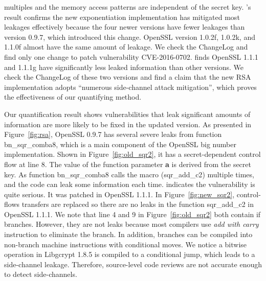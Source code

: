 multiples and the memory access patterns are independent of the secret key.
\tool{}'s result confirms the new exponentiation implementation has mitigated 
most leakages effectively because the four newer versions have fewer
leakages than version 0.9.7, which introduced this change.
OpenSSL version 1.0.2f, 1.0.2k, and 1.1.0f almost have the
same amount of leakage. We check the ChangeLog and find only one change to
patch vulnerability CVE-2016-0702. 
\tool{} finds OpenSSL 1.1.1 and 1.1.1g have significantly less
leaked information than other versions.
We check the ChangeLog of these two versions and find a claim that
the new RSA implementation adopts ``numerous side-channel attack mitigation'', 
which proves the effectiveness of our quantifying method.



Our quantification result shows vulnerabilities
that leak significant amounts of information
are more likely to be fixed in the updated version.
As presented in Figure~\ref{fig:rsa}, 
OpenSSL 0.9.7 has several severe leaks from
function \textsf{bn\_sqr\_comba8}, which is a main 
component of the OpenSSL big number implementation.
Shown in Figure~\ref{fig:old_sqr2}, it has a 
secret-dependent control flow at line 8.
The value of the function parameter \textbf{a} is derived from
the secret key. 
As function \textsf{bn\_sqr\_comba8}
calls the macro (\textsf{sqr\_add\_c2}) multiple times, 
and the code can leak some information each time.
\tool{} indicates the vulnerability is quite serious. 
It was patched in OpenSSL 1.1.1\@. In 
Figure~\ref{fig:new_sqr2}, control-flows transfers are replaced
so there are no leaks in the function
\textsf{sqr\_add\_c2} in OpenSSL 1.1.1\@. We note
that line 4 and 9 in Figure~\ref{fig:old_sqr2} both contain if branches.
However, they are not leaks because
most compilers use \emph{add with carry} instruction to eliminate the branch.
In addition, branches can be compiled into non-branch machine instructions 
with conditional moves. 
We notice a bitwise operation in Libgcrypt 1.8.5 is compiled to a conditional 
jump, which leads to a side-channel leakage.
Therefore, source-level code reviews are not accurate
enough to detect side-channels. 

